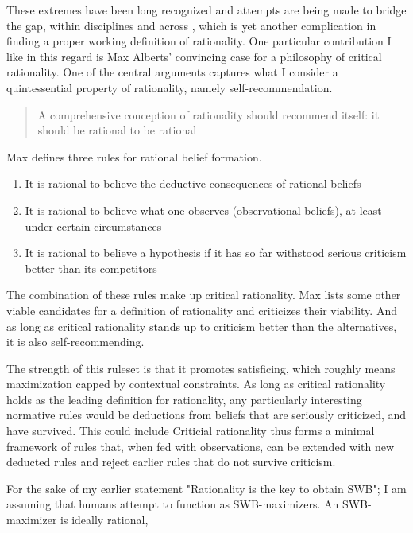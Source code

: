 These extremes have been long recognized and attempts are being made to bridge the gap, within disciplines \cite{Luce1994} and across \cite{Mcfall2015}, which is yet another complication in finding a proper working definition of rationality. One particular contribution I like in this regard is Max Alberts' \cite{Albert2009} convincing case for a philosophy of critical rationality. One of the central arguments captures what I consider a quintessential property of rationality, namely self-recommendation.

\begin{quote}
    A comprehensive conception of rationality should recommend itself: it should be rational to be rational
\end{quote}

Max defines three rules for rational belief formation.

\begin{enumerate}
    \item It is rational to believe the deductive consequences of rational beliefs
    \item It is rational to believe what one observes (observational beliefs), at least under certain circumstances
    \item It is rational to believe a hypothesis if it has so far withstood serious criticism better than its competitors
\end{enumerate}

The combination of these rules make up critical rationality. Max lists some other viable candidates for a definition of rationality and criticizes their viability. And as long as critical rationality stands up to criticism better than the alternatives, it is also self-recommending.

The strength of this ruleset is that it promotes satisficing, which roughly means maximization capped by contextual constraints. As long as critical rationality holds as the leading definition for rationality, any particularly interesting normative rules would be deductions from beliefs that are seriously criticized, and have survived. This could include 
Criticial rationality thus forms a minimal framework of rules that, when fed with observations, can be extended with new deducted rules and reject earlier rules that do not survive criticism.

For the sake of my earlier statement "Rationality is the key to obtain SWB"; I am assuming that humans attempt to function as SWB-maximizers. An SWB-maximizer is ideally rational, 


